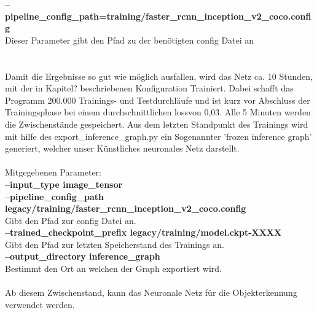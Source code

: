 \documentclass[a4paper,12pt,oneside]{article}
\begin{document}
\textbf{--pipeline\_config\_path=training/faster\_rcnn\_inception\_v2\_coco.config}\\
Dieser Parameter gibt den Pfad zu der benötigten config Datei an\\\\
\\
Damit die Ergebnisse so gut wie möglich ausfallen, wird das Netz ca. 10 Stunden, mit der in Kapitel? beschriebenen Konfiguration Trainiert. Dabei schafft das Programm 200.000 Trainings- und Testdurchläufe und ist kurz vor Abschluss der Trainingsphase bei einem durchschnittlichen \glqq loss\grqq von 0,03. Alle 5 Minuten werden die Zwischenstände gespeichert. Aus dem letzten Standpunkt des Trainings wird mit hilfe des export\_inference\_graph.py  ein Sogenannter 'frozen inference graph' generiert, welcher unser Künstliches neuronales Netz darstellt.\\\\
Mitgegebenen Parameter:\\
\textbf{--input\_type image\_tensor}\\
\textbf{--pipeline\_config\_path legacy/training/faster\_rcnn\_inception\_v2\_coco.config}\\
Gibt den Pfad zur config Datei an.\\
\textbf{--trained\_checkpoint\_prefix legacy/training/model.ckpt-XXXX}\\
Gibt den Pfad zur letzten Speicherstand des Trainings an.\\
\textbf{--output\_directory inference\_graph}\\
Bestimmt den Ort an welchen der Graph exportiert wird.\\\\

Ab diesem Zwischenstand, kann das Neuronale Netz für die Objekterkennung verwendet werden.
  
\newpage
\end{document}
